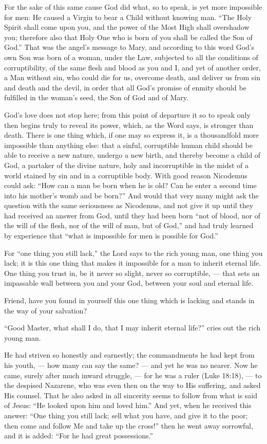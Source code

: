 For the sake of this same cause God did what, so to speak, is yet more impossible for men: He caused a Virgin to bear a Child without knowing man. “The Holy Spirit shall come upon you, and the power of the Most High shall overshadow you; therefore also that Holy One who is born of you shall be called the Son of God.” That was the angel’s message to Mary, and according to this word God’s own Son was born of a woman, under the Law, subjected to all the conditions of corruptibility, of the same flesh and blood as you and I, and yet of another order, a Man without sin, who could die for us, overcome death, and deliver us from sin and death and the devil, in order that all God’s promise of enmity should be fulfilled in the woman’s seed, the Son of God and of Mary.

God’s love does not stop here; from this point of departure it so to speak only then begins truly to reveal its power, which, as the Word says, is stronger than death. There is one thing which, if one may so express it, is a thousandfold more impossible than anything else: that a sinful, corruptible human child should be able to receive a new nature, undergo a new birth, and thereby become a child of God, a partaker of the divine nature, holy and incorruptible in the midst of a world stained by sin and in a corruptible body. With good reason Nicodemus could ask: “How can a man be born when he is old? Can he enter a second time into his mother’s womb and be born?” And would that very many might ask the question with the same seriousness as Nicodemus, and not give it up until they had received an answer from God, until they had been born “not of blood, nor of the will of the flesh, nor of the will of man, but of God,” and had truly learned by experience that “what is impossible for men is possible for God.”

For “one thing you still lack,” the Lord says to the rich young man, one thing you lack; it is this one thing that makes it impossible for a man to inherit eternal life. One thing you trust in, be it never so slight, never so corruptible, — that sets an impassable wall between you and your God, between your soul and eternal life.

Friend, have you found in yourself this one thing which is lacking and stands in the way of your salvation?

“Good Master, what shall I do, that I may inherit eternal life?” cries out the rich young man.

He had striven so honestly and earnestly; the commandments he had kept from his youth, — how many can say the same? — and yet he was no nearer. Now he came, surely after much inward struggle, — for he was a ruler (Luke 18:18), — to the despised Nazarene, who was even then on the way to His suffering, and asked His counsel. That he also asked in all sincerity seems to follow from what is said of Jesus: “He looked upon him and loved him.” And yet, when he received this answer: “One thing you still lack; sell what you have, and give it to the poor; then come and follow Me and take up the cross!” then he went away sorrowful, and it is added: “For he had great possessions.”

